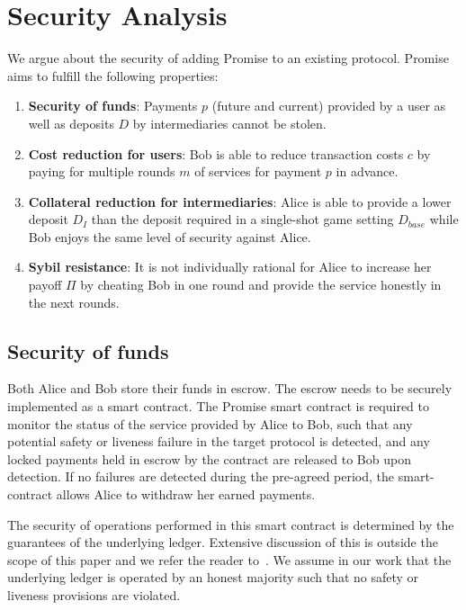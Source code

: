 \documentclass[runningheads]{llncs}
\newcommand{\sys}{Promise\xspace}
\begin{document}

\section{Security Analysis}
\label{sec:security}

We argue about the security of adding \sys to an existing protocol.
\sys aims to fulfill the following properties:

\begin{enumerate}
    \item \textbf{Security of funds}: Payments $p$ (future and current) provided by a user as well as deposits $D$ by intermediaries cannot be stolen.
    \item \textbf{Cost reduction for users}: Bob is able to reduce transaction costs $c$ by paying for multiple rounds $m$ of services for payment $p$ in advance.
    \item \textbf{Collateral reduction for intermediaries}: Alice is able to provide a lower deposit $D_I$ than the deposit required in a single-shot game setting $D_{base}$ while Bob enjoys the same level of security against Alice.
    \item \textbf{Sybil resistance}: It is not individually rational for Alice to increase her payoff $\Pi$ by cheating Bob in one round and provide the service honestly in the next rounds.
\end{enumerate}

\subsection{Security of funds}
Both Alice and Bob store their funds in escrow.
The escrow needs to be securely implemented as a smart contract.
The \sys smart contract is required to monitor the status of the service provided by Alice to Bob, such that any potential safety or liveness failure in the target protocol is detected, and any locked payments held in escrow by the contract are released to Bob upon detection. If no failures are detected during the pre-agreed period, the smart-contract allows Alice to withdraw her earned payments.

The security of operations performed in this smart contract is determined by the guarantees of the underlying ledger. Extensive discussion of this is outside the scope of this paper and we refer the reader to~\cite{garay2016bitcoin,gervais2016security,sompolinsky2016bitcoin}. We assume in our work that the underlying ledger is operated by an honest majority such that no safety or liveness provisions are violated.
\end{document}
